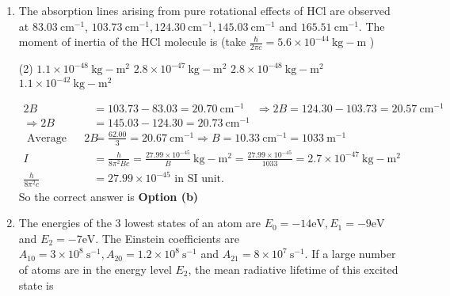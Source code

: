 \begin{enumerate}
\begin{answer}
\begin{align*}
	\Delta E_{3}&\left(F=1, I=\frac{1}{2}, J=\frac{3}{2}\right) ; \quad \Delta E_{3}=\lambda \frac{2-\frac{3}{4}-\frac{15}{4}}{2} \hbar^{2}=-\frac{5}{4} \lambda \hbar^{2}\\
	\Delta E_{4}&\left(F=2, I=\frac{1}{2}, J=\frac{3}{2}\right) ; \quad \Delta E_{4}=\lambda \frac{6-\frac{3}{4}-\frac{15}{4}}{2}=\frac{3}{4} \lambda \hbar^{2}
	\intertext{Out of these four possibilities lowest state is corresponding to following quantum number}
	F&=1, I=\frac{1}{2}, J=\frac{3}{2}, L=1, S=\frac{1}{2}
	\end{align*}
		So the correct answer is \textbf{Option (b)}
\end{answer}
\item  The absorption lines arising from pure rotational effects of $\mathrm{HCl}$ are observed at $83.03 \mathrm{~cm}^{-1}$, $103.73 \mathrm{~cm}^{-1}, 124.30 \mathrm{~cm}^{-1}, 145.03 \mathrm{~cm}^{-1}$ and $165.51 \mathrm{~cm}^{-1}$. The moment of inertia of the $\mathrm{HCl}$ molecule is (take $\frac{\hbar}{2 \pi c}=5.6 \times 10^{-44} \mathrm{~kg}-\mathrm{m}$ )
 \begin{tasks}(2)
	\task[\textbf{a.}] $1.1 \times 10^{-48} \mathrm{~kg}-\mathrm{m}^{2}$
	\task[\textbf{b.}]$2.8 \times 10^{-47} \mathrm{~kg}-\mathrm{m}^{2}$
	\task[\textbf{c.}]$2.8 \times 10^{-48} \mathrm{~kg}-\mathrm{m}^{2}$
	\task[\textbf{d.}] $1.1 \times 10^{-42} \mathrm{~kg}-\mathrm{m}^{2}$
\end{tasks}
\begin{answer}
	\begin{align*}
	2 B&=103.73-83.03=20.70 \mathrm{~cm}^{-1} \quad \Rightarrow 2 B=124.30-103.73=20.57 \mathrm{~cm}^{-1}\\
	\Rightarrow 2 B&=145.03-124.30=20.73 \mathrm{~cm}^{-1}\\
\text{	Average value }2 B&=\frac{62.00}{3}=20.67 \mathrm{~cm}^{-1} \Rightarrow B=10.33 \mathrm{~cm}^{-1}=1033 \mathrm{~m}^{-1}\\
	I&=\frac{h}{8 \pi^{2} B c}=\frac{27.99 \times 10^{-45}}{B} \mathrm{~kg}-\mathrm{m}^{2}=\frac{27.99 \times 10^{-45}}{1033}=2.7 \times 10^{-47} \mathrm{~kg}-\mathrm{m}^{2}\\
	\frac{h}{8 \pi^{2} c}&=27.99 \times 10^{-45}\text{ in SI unit.}
	\end{align*}
		So the correct answer is \textbf{Option (b)}
\end{answer}
\item  The energies of the 3 lowest states of an atom are $E_{0}=-14 \mathrm{eV}, E_{1}=-9 \mathrm{eV}$ and $E_{2}=-7 \mathrm{eV}$. The Einstein coefficients are $A_{10}=3 \times 10^{8} \mathrm{~s}^{-1}, A_{20}=1.2 \times 10^{8} \mathrm{~s}^{-1}$ and $A_{21}=8 \times 10^{7} \mathrm{~s}^{-1}$. If a large number of atoms are in the energy level $E_{2}$, the mean radiative lifetime of this excited state is

\end{enumerate}
